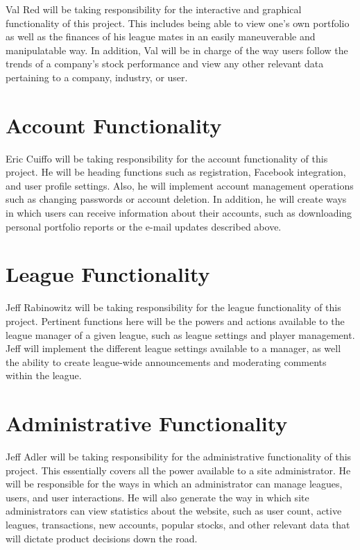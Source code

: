 \documentclass[11pt,letterpaper,oneside]{memoir}
\begin{document}
Val Red will be taking responsibility for the interactive and graphical functionality of this project.
This includes being able to view one's own portfolio as well as the finances of his league mates in
an easily maneuverable and manipulatable way. In addition, Val will be in charge of the way
users follow the trends of a company's stock performance and view any other relevant data
pertaining to a company, industry, or user.

\section{Account Functionality}
Eric Cuiffo will be taking responsibility for the account functionality of this project. He will be
heading functions such as registration, Facebook integration, and user profile settings. Also,
he will implement account management operations such as changing passwords or account deletion.
In addition, he will create ways in which users can receive information about their accounts, such
as downloading personal portfolio reports or the e-mail updates described above.

\section{League Functionality}
Jeff Rabinowitz will be taking responsibility for the league functionality of this project. Pertinent
functions here will be the powers and actions available to the league manager of a given league,
such as league settings and player management. Jeff will implement the different league
settings available to a manager, as well the ability to create league-wide announcements and
moderating comments within the league.

\section{Administrative Functionality}

Jeff Adler will be taking responsibility for the administrative functionality of this project. This essentially
covers all the power available to a site administrator. He will be responsible for the ways in which an
administrator can manage leagues, users, and user interactions. He will also generate the way in which
site administrators can view statistics about the website, such as user count, active leagues, transactions,
new accounts, popular stocks, and other relevant data that will dictate product decisions down the road.
\end{document}
